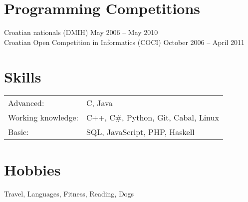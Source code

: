 \documentclass[margin,line]{resume}
\begin{document}
\begin{resume}
\vspace{1mm}
\section{\mysidestyle Programming Competitions} 

Croatian nationals (DMIH) \hfill May 2006 -- May 2010\\%
Croatian Open Competition in Informatics (COCI) \hfill October 2006 -- April 2011\\%

\vspace{-3mm}
\section{\mysidestyle Skills}

\begin{tabular}{@{}ll@{}}
Advanced: & C, Java \\%
Working knowledge: & C++, C\#, Python, Git, Cabal, Linux \\%
Basic: & SQL, JavaScript, PHP, Haskell \\%
\end{tabular}




\vspace{1mm}
\section{\mysidestyle Hobbies}
Travel, Languages, Fitness, Reading, Dogs

\end{resume}
\end{document}
